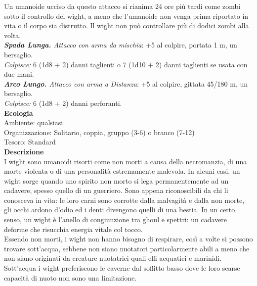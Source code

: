 \begin{multicols}{2}
Un umanoide ucciso da questo attacco si rianima 24 ore più tardi come zombi sotto il controllo del wight, a meno che l'umanoide non venga prima riportato in vita o il corpo sia distrutto. Il wight non può controllare più di dodici zombi alla volta.\\

\emph{\textbf{Spada Lunga.} Attacco con arma da mischia}: +5 al colpire, portata 1 m, un bersaglio.\\
\emph{Colpisce:} 6 (1d8 + 2) danni taglienti o 7 (1d10 + 2) danni taglienti se usata con due mani.\\
\emph{\textbf{Arco Lungo.} Attacco con arma a Distanza}: +5 al colpire, gittata 45/180 m, un bersaglio.\\
\emph{Colpisce:} 6 (1d8 + 2) danni perforanti.\\
\textbf{Ecologia}\\
Ambiente: qualsiasi\\
Organizzazione: Solitario, coppia, gruppo (3-6) o branco (7-12)\\
Tesoro: Standard\\
\textbf{Descrizione}\\
I wight sono umanoidi risorti come non morti a causa della necromanzia, di una morte violenta o di una personalità estremamente malevola. In alcuni casi, un wight sorge quando uno spirito non morto si lega permanentemente ad un cadavere, spesso quello di un guerriero. Sono appena riconoscibili da chi li conosceva in vita: le loro carni sono corrotte dalla malvagità e dalla non morte, gli occhi ardono d’odio ed i denti divengono quelli di una bestia. In un certo senso, un wight è l’anello di congiunzione tra ghoul e spettri: un cadavere deforme che risucchia energia vitale col tocco.\\

Essendo non morti, i wight non hanno bisogno di respirare, così a volte si possono trovare sott’acqua, sebbene non siano nuotatori particolarmente abili a meno che non siano originati da creature nuotatrici quali elfi acquatici e marinidi. Sott’acqua i wight preferiscono le caverne dal soffitto basso dove le loro scarse capacità di nuoto non sono una limitazione.\\


\end{multicols}
